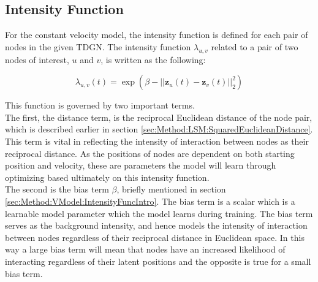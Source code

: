 \subsection{Intensity Function}
\label{sec:Method:IntensityFunc}

For the constant velocity model, the intensity function is defined for each pair of nodes in the given TDGN.
The intensity function $\lambda_{u,v}$ related to a pair of two nodes of interest, $u$ and $v$, is written as the following:

\begin{equation}
    \lambda_{u,v}(t)
    =
    \exp \left(\beta - ||\textbf{z}_u(t) - \textbf{z}_v(t)||_2^2\right)
    \label{eq:IntensityFunc}
\end{equation}

This function is governed by two important terms.
\\
The first, the distance term, is the reciprocal Euclidean distance of the node pair, which is described earlier in section \ref{sec:Method:LSM:SquaredEuclideanDistance}.
This term is vital in reflecting the intensity of interaction between nodes as their reciprocal distance.
As the positions of nodes are dependent on both starting position and velocity, these are parameters the model will learn through optimizing based ultimately on this intensity function.
\\
The second is the bias term $\beta$, briefly mentioned in section \ref{sec:Method:VModel:IntensityFuncIntro}.
The bias term is a scalar which is a learnable model parameter which the model learns during training. The bias term serves as the background intensity, and hence models the intensity of interaction between nodes regardless of their reciprocal distance in Euclidean space. In this way a large bias term will mean that nodes have an increased likelihood of interacting regardless of their latent positions and the opposite is true for a small bias term.




